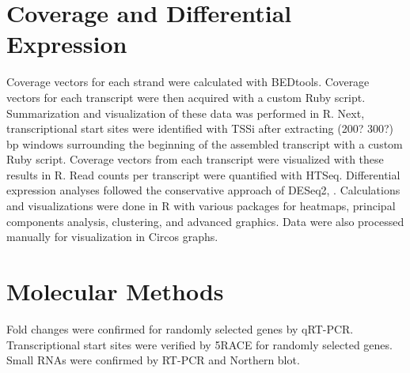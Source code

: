 \section{Coverage and Differential Expression}
Coverage vectors for each strand were calculated with BEDtools\cite{49}. Coverage vectors for each transcript were then acquired with a custom Ruby script. Summarization and visualization of these data was performed in R\cite{59}. Next, transcriptional start sites were identified with TSSi\cite{15} after extracting (200? 300?) bp windows surrounding the beginning of the assembled transcript with a custom Ruby script. Coverage vectors from each transcript were visualized with these results in R. Read counts per transcript were quantified with HTSeq\cite{48}. Differential expression analyses followed the conservative approach of DESeq2\cite{52}, \cite{53}. Calculations and visualizations were done in R with various packages for heatmaps, principal components analysis, clustering, and advanced graphics\cite{55}. Data were also processed manually for visualization in Circos graphs\cite{50}.

\section{Molecular Methods}
Fold changes were confirmed for randomly selected genes by qRT-PCR. Transcriptional start sites were verified by 5\textprime  RACE for randomly selected genes. Small RNAs were confirmed by RT-PCR and Northern blot.
